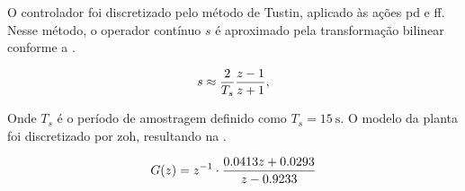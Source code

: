 O controlador foi discretizado pelo método de Tustin, aplicado às ações \gls{pd}
e \gls{ff}. Nesse método, o operador contínuo $s$ é aproximado pela
transformação bilinear conforme a .

\begin{equation}
  \eqlabel{tustin}
  s \approx \frac{2}{T_s}\frac{z-1}{z+1},
\end{equation}

Onde $T_s$ é o período de amostragem definido como $T_s = \SI{15}{\second}$.
O modelo da planta foi discretizado por \gls{zoh}, resultando na
.

\begin{equation}
  \eqlabel{planta-gz-zoh}
  G(z) = z^{-1} \cdot \frac{0.0413z + 0.0293}{z - 0.9233}
\end{equation}


